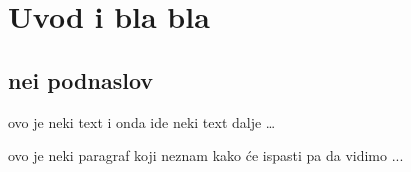 \chapter{Uvod i bla bla}
\section{nei podnaslov}
ovo je neki text
i onda ide neki text dalje \ldots

ovo je neki paragraf koji neznam kako će ispasti pa da vidimo ...